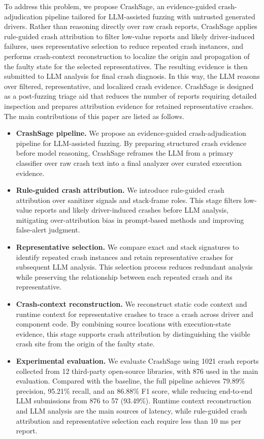 \documentclass[pdflatex,sn-basic]{sn-jnl}%
\theoremstyle{thmstyleone}%
\theoremstyle{thmstyletwo}%
\theoremstyle{thmstylethree}%
\begin{document}
To address this problem, we propose CrashSage, an evidence-guided crash-adjudication pipeline tailored for LLM-assisted fuzzing with untrusted generated drivers. Rather than reasoning directly over raw crash reports, CrashSage applies rule-guided crash attribution to filter low-value reports and likely driver-induced failures, uses representative selection to reduce repeated crash instances, and performs crash-context reconstruction to localize the origin and propagation of the faulty state for the selected representatives. The resulting evidence is then submitted to LLM analysis for final crash diagnosis. In this way, the LLM reasons over filtered, representative, and localized crash evidence. CrashSage is designed as a post-fuzzing triage aid that reduces the number of reports requiring detailed inspection and prepares attribution evidence for retained representative crashes. The main contributions of this paper are listed as follows.

\begin{itemize}
    \item \textbf{CrashSage pipeline.} We propose an evidence-guided crash-adjudication pipeline for LLM-assisted fuzzing. By preparing structured crash evidence before model reasoning, CrashSage reframes the LLM from a primary classifier over raw crash text into a final analyzer over curated execution evidence.
    \item \textbf{Rule-guided crash attribution.} We introduce rule-guided crash attribution over sanitizer signals and stack-frame roles. This stage filters low-value reports and likely driver-induced crashes before LLM analysis, mitigating over-attribution bias in prompt-based methods and improving false-alert judgment.
    \item \textbf{Representative selection.} We compare exact and stack signatures to identify repeated crash instances and retain representative crashes for subsequent LLM analysis. This selection process reduces redundant analysis while preserving the relationship between each repeated crash and its representative.
    \item \textbf{Crash-context reconstruction.} We reconstruct static code context and runtime context for representative crashes to trace a crash across driver and component code. By combining source locations with execution-state evidence, this stage supports crash attribution by distinguishing the visible crash site from the origin of the faulty state.
    \item \textbf{Experimental evaluation.} We evaluate CrashSage using 1021 crash reports collected from 12 third-party open-source libraries, with 876 used in the main evaluation. Compared with the baseline, the full pipeline achieves 79.89\% precision, 95.21\% recall, and an 86.88\% F1 score, while reducing end-to-end LLM submissions from 876 to 57 (93.49\%). Runtime context reconstruction and LLM analysis are the main sources of latency, while rule-guided crash attribution and representative selection each require less than 10 ms per report.
\end{itemize}
\end{document}
